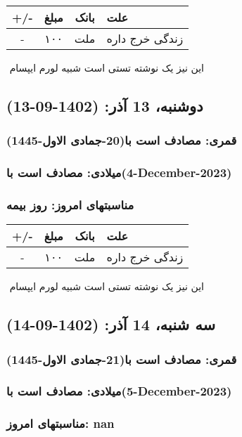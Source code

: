 \documentclass{article}
\newcommand{\rnote}[1]{\marginpar{\textcolor{color}{\StrSubstitute{\##1}{ }{\_}}}}
\newcommand{\myRow}[4]{
    #1 & #2 & #3 & #4 \\ \hline
}
\begin{document}
\begin{tabular}{ | c | c | c | p{5cm} |}
    \hline
    \myRow{ +/- }{مبلغ}{بانک}{علت}
    \myRow{-}{۱۰۰}{ملت}{زندگی خرج داره}
\end{tabular}
\newline
\newline

‌
\rnote{تست}
این نیز یک نوشته تستی است شبیه لورم ایپسام




\newpage
{}
\textcolor{color}{
\section{ دوشنبه، 13 آذر: (1402-09-13) }
\subsubsection*{قمری: مصادف است با(20-جمادی الاول-1445)} 
\subsubsection*{میلادی: مصادف است با(4-December-2023)}
\subsubsection*{مناسبتهای امروز: روز بیمه}
}


\begin{tabular}{ | c | c | c | p{5cm} |}
    \hline
    \myRow{ +/- }{مبلغ}{بانک}{علت}
    \myRow{-}{۱۰۰}{ملت}{زندگی خرج داره}
\end{tabular}
\newline
\newline

‌
\rnote{تست}
این نیز یک نوشته تستی است شبیه لورم ایپسام




\newpage
{}
\textcolor{color}{
\section{ سه شنبه، 14 آذر: (1402-09-14) }
\subsubsection*{قمری: مصادف است با(21-جمادی الاول-1445)} 
\subsubsection*{میلادی: مصادف است با(5-December-2023)}
\subsubsection*{مناسبتهای امروز: nan}
}
\end{document}
